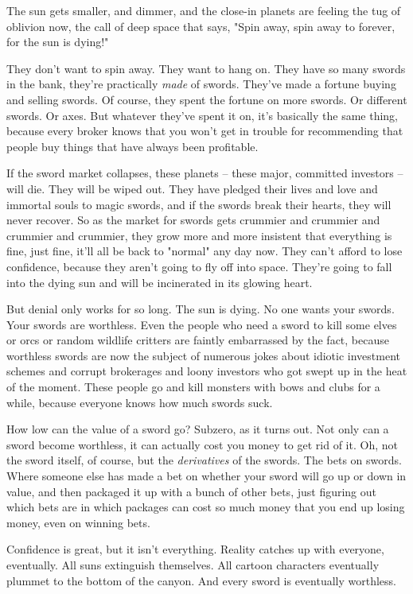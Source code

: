 The sun gets smaller, and dimmer, and the close-in planets are
feeling the tug of oblivion now, the call of deep space that says,
"Spin away, spin away to forever, for the sun is dying!"

They don't want to spin away. They want to hang on. They have so
many swords in the bank, they're practically \emph{made} of swords.
They've made a fortune buying and selling swords. Of course, they
spent the fortune on more swords. Or different swords. Or axes. But
whatever they've spent it on, it's basically the same thing,
because every broker knows that you won't get in trouble for
recommending that people buy things that have always been
profitable.

If the sword market collapses, these planets -- these major,
committed investors -- will die. They will be wiped out. They have
pledged their lives and love and immortal souls to magic swords,
and if the swords break their hearts, they will never recover. So
as the market for swords gets crummier and crummier and crummier
and crummier, they grow more and more insistent that everything is
fine, just fine, it'll all be back to "normal" any day now. They
can't afford to lose confidence, because they aren't going to fly
off into space. They're going to fall into the dying sun and will
be incinerated in its glowing heart.

But denial only works for so long. The sun is dying. No one wants
your swords. Your swords are worthless. Even the people who need a
sword to kill some elves or orcs or random wildlife critters are
faintly embarrassed by the fact, because worthless swords are now
the subject of numerous jokes about idiotic investment schemes and
corrupt brokerages and loony investors who got swept up in the heat
of the moment. These people go and kill monsters with bows and
clubs for a while, because everyone knows how much swords suck.

How low can the value of a sword go? Subzero, as it turns out. Not
only can a sword become worthless, it can actually cost you money
to get rid of it. Oh, not the sword itself, of course, but the
\emph{derivatives} of the swords. The bets on swords. Where someone
else has made a bet on whether your sword will go up or down in
value, and then packaged it up with a bunch of other bets, just
figuring out which bets are in which packages can cost so much
money that you end up losing money, even on winning bets.

Confidence is great, but it isn't everything. Reality catches up
with everyone, eventually. All suns extinguish themselves. All
cartoon characters eventually plummet to the bottom of the canyon.
And every sword is eventually worthless.

